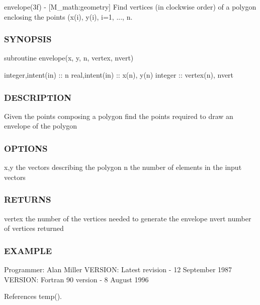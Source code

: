 envelope(3f) -\/ \mbox{[}M\+\_\+math\+:geometry\mbox{]} Find vertices (in clockwise order) of a polygon enclosing the points (x(i), y(i), i=1, ..., n. \subsubsection*{S\+Y\+N\+O\+P\+S\+IS}

subroutine envelope(x, y, n, vertex, nvert)

integer,intent(in) \+:\+: n real,intent(in) \+:\+: x(n), y(n) integer \+:\+: vertex(n), nvert

\subsubsection*{D\+E\+S\+C\+R\+I\+P\+T\+I\+ON}

Given the points composing a polygon find the points required to draw an envelope of the polygon

\subsubsection*{O\+P\+T\+I\+O\+NS}

x,y the vectors describing the polygon n the number of elements in the input vectors

\subsubsection*{R\+E\+T\+U\+R\+NS}

vertex the number of the vertices needed to generate the envelope nvert number of vertices returned

\subsubsection*{E\+X\+A\+M\+P\+LE}

Programmer\+: Alan Miller V\+E\+R\+S\+I\+ON\+: Latest revision -\/ 12 September 1987 V\+E\+R\+S\+I\+ON\+: Fortran 90 version -\/ 8 August 1996 

References temp().

\mbox{\label{namespacem__math_a70e89987b4dfc6f42864fb9c6907b5b1}} 
